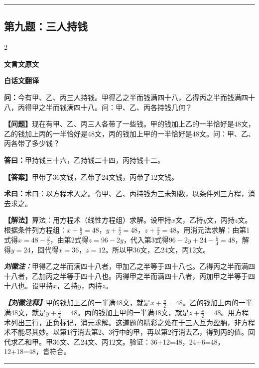 \documentclass[10pt,a4paper]{article}
\newcommand{\wen}[1]{\textbf{\color{problemcolor}问：}#1\par}
\newcommand{\da}[1]{\textbf{答曰：}#1\par}
\newcommand{\shu}[1]{\textbf{术曰：}#1\par}
\newcommand{\liuhui}[1]{{\color{commentarycolor}\textit{\textbf{刘徽注：}}#1\par}}
\newcommand{\classicalheader}[1]{{\centering\large\bfseries\color{classicalcolor} #1\par\vspace{0.5em}}}
\newcommand{\wenmodern}[1]{\textbf{\color{moderncolor}【问题】}#1\par}
\newcommand{\damodern}[1]{\textbf{【答案】}#1\par}
\newcommand{\shumodern}[1]{\textbf{【解法】}#1\par}
\newcommand{\liuhuimodern}[1]{{\color{commentarycolor}\textit{\textbf{【刘徽注释】}}#1\par}}
\newcommand{\modernheader}[1]{{\centering\large\bfseries\color{moderncolor} #1\par\vspace{0.5em}}}
\newcommand{\problemsec}[1]{\subsection*{#1}}
\begin{document}
\vspace{0.3cm}
\hrule
\vspace{0.3cm}

\problemsec{第九题：三人持钱}
\begin{paracol}{2}
\classicalheader{文言文原文}
\switchcolumn
\modernheader{白话文翻译}
\switchcolumn*

\wen{今有甲、乙、丙三人持钱。甲得乙之半而钱满四十八，乙得丙之半而钱满四十八，丙得甲之半而钱满四十八。问：甲、乙、丙各持钱几何？}

\switchcolumn

\wenmodern{现在有甲、乙、丙三人各带了一些钱。甲的钱加上乙的一半恰好是48文，乙的钱加上丙的一半恰好是48文，丙的钱加上甲的一半恰好是48文。问：甲、乙、丙各带了多少钱？}

\switchcolumn*

\da{甲持钱三十六，乙持钱二十四，丙持钱十二。}

\switchcolumn

\damodern{甲带了36文钱，乙带了24文钱，丙带了12文钱。}

\switchcolumn*

\shu{术曰：以方程术入之。令甲、乙、丙持钱为三未知数，以条件列三方程，消去求之。}

\switchcolumn

\shumodern{算法：用方程术（线性方程组）求解。设甲持$x$文，乙持$y$文，丙持$z$文。根据条件列方程组：$x+\frac{y}{2}=48$，$y+\frac{z}{2}=48$，$z+\frac{x}{2}=48$。用消元法求解：由第1式得$x=48-\frac{y}{2}$，由第2式得$z=96-2y$，代入第3式得$96-2y+24-\frac{y}{4}=48$，解得$y=24$，回代得$x=36$，$z=12$。所以甲36文，乙24文，丙12文。}

\switchcolumn*

\liuhui{甲得乙之半而满四十八者，甲加乙之半等于四十八也。乙得丙之半而满四十八者，乙加丙之半等于四十八也。丙得甲之半而满四十八者，丙加甲之半等于四十八也。设甲持$x$，乙持$y$，丙持$z$。}

\switchcolumn

\liuhuimodern{甲的钱加上乙的一半满48文，就是$x+\frac{y}{2}=48$。乙的钱加上丙的一半满48文，就是$y+\frac{z}{2}=48$。丙的钱加上甲的一半满48文，就是$z+\frac{x}{2}=48$。用方程术列出三行，正负标记，消元求解。这道题的精彩之处在于三人互为盈肭，非方程术不能尽其妙。以第1行消去第2、3行中的甲，再以第2行消去乙，得到丙的值。回代求乙和甲。甲36文、乙24文、丙12文。验证：36+12=48，24+6=48，12+18=48，皆符合。}

\end{paracol}

\vspace{0.3cm}
\hrule
\vspace{0.3cm}
\end{document}
